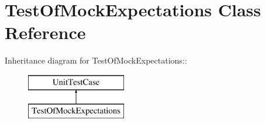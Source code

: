 \hypertarget{class_test_of_mock_expectations}{
\section{TestOfMockExpectations Class Reference}
\label{class_test_of_mock_expectations}
}
Inheritance diagram for TestOfMockExpectations::\begin{figure}[H]
\begin{center}
\leavevmode
\includegraphics[height=2cm]{class_test_of_mock_expectations}
\end{center}
\end{figure}
